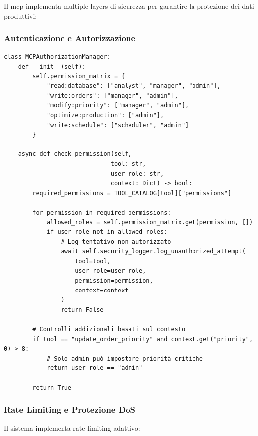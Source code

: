 Il \gls{mcp} implementa multiple layers di sicurezza per garantire la protezione dei dati produttivi:

\subsubsection{Autenticazione e Autorizzazione}
\begin{listing}[H]
\begin{verbatim}
class MCPAuthorizationManager:
    def __init__(self):
        self.permission_matrix = {
            "read:database": ["analyst", "manager", "admin"],
            "write:orders": ["manager", "admin"],
            "modify:priority": ["manager", "admin"],
            "optimize:production": ["admin"],
            "write:schedule": ["scheduler", "admin"]
        }
    
    async def check_permission(self, 
                              tool: str, 
                              user_role: str,
                              context: Dict) -> bool:
        required_permissions = TOOL_CATALOG[tool]["permissions"]
        
        for permission in required_permissions:
            allowed_roles = self.permission_matrix.get(permission, [])
            if user_role not in allowed_roles:
                # Log tentativo non autorizzato
                await self.security_logger.log_unauthorized_attempt(
                    tool=tool,
                    user_role=user_role,
                    permission=permission,
                    context=context
                )
                return False
        
        # Controlli addizionali basati sul contesto
        if tool == "update_order_priority" and context.get("priority", 0) > 8:
            # Solo admin può impostare priorità critiche
            return user_role == "admin"
        
        return True
\end{verbatim}
\caption{Sistema di autorizzazione MCP}
\label{listing:mcp-authorization}
\end{listing}

\subsubsection{Rate Limiting e Protezione DoS}
Il sistema implementa rate limiting adattivo:


